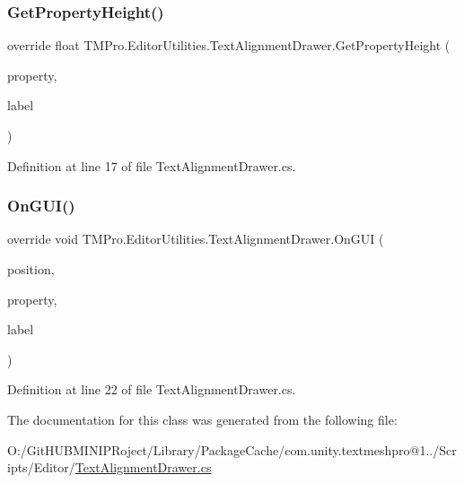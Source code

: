 \subsubsection{\texorpdfstring{GetPropertyHeight()}{GetPropertyHeight()}}
{\footnotesize\ttfamily override float T\+M\+Pro.\+Editor\+Utilities.\+Text\+Alignment\+Drawer.\+Get\+Property\+Height (\begin{DoxyParamCaption}\item[{Serialized\+Property}]{property,  }\item[{G\+U\+I\+Content}]{label }\end{DoxyParamCaption})}



Definition at line 17 of file Text\+Alignment\+Drawer.\+cs.

\mbox{\label{class_t_m_pro_1_1_editor_utilities_1_1_text_alignment_drawer_a3bbf4975e7620733f28e5a8da37ce9ed}} 
\subsubsection{\texorpdfstring{OnGUI()}{OnGUI()}}
{\footnotesize\ttfamily override void T\+M\+Pro.\+Editor\+Utilities.\+Text\+Alignment\+Drawer.\+On\+G\+UI (\begin{DoxyParamCaption}\item[{Rect}]{position,  }\item[{Serialized\+Property}]{property,  }\item[{G\+U\+I\+Content}]{label }\end{DoxyParamCaption})}



Definition at line 22 of file Text\+Alignment\+Drawer.\+cs.



The documentation for this class was generated from the following file\+:\begin{DoxyCompactItemize}
\item 
O\+:/\+Git\+H\+U\+B\+M\+I\+N\+I\+P\+Roject/\+Library/\+Package\+Cache/com.\+unity.\+textmeshpro@1../\+Scripts/\+Editor/\mbox{\hyperlink{_text_alignment_drawer_8cs}{Text\+Alignment\+Drawer.\+cs}}\end{DoxyCompactItemize}
